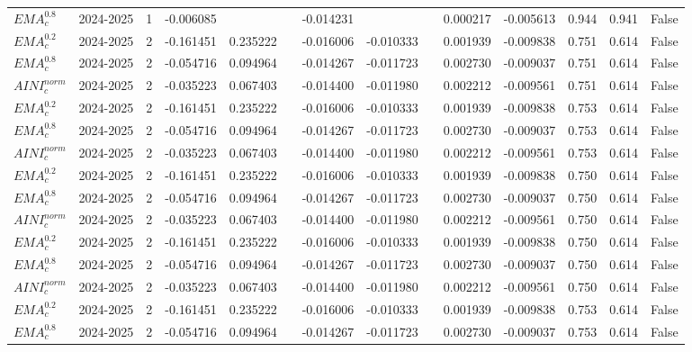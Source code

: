 \begin{tabular}{@{}llrrrrrrrrrlll@{}}
$EMA^{0.8}_{c}$ & 2024-2025 & 1 & -0.006085 &  &  & -0.014231 &  &  & 0.000217 & -0.005613 & 0.944 & 0.941 & False \\
$EMA^{0.2}_{c}$ & 2024-2025 & 2 & -0.161451 & 0.235222 &  & -0.016006 & -0.010333 &  & 0.001939 & -0.009838 & 0.751 & 0.614 & False \\
$EMA^{0.8}_{c}$ & 2024-2025 & 2 & -0.054716 & 0.094964 &  & -0.014267 & -0.011723 &  & 0.002730 & -0.009037 & 0.751 & 0.614 & False \\
$AINI^{norm}_{c}$ & 2024-2025 & 2 & -0.035223 & 0.067403 &  & -0.014400 & -0.011980 &  & 0.002212 & -0.009561 & 0.751 & 0.614 & False \\
$EMA^{0.2}_{c}$ & 2024-2025 & 2 & -0.161451 & 0.235222 &  & -0.016006 & -0.010333 &  & 0.001939 & -0.009838 & 0.753 & 0.614 & False \\
$EMA^{0.8}_{c}$ & 2024-2025 & 2 & -0.054716 & 0.094964 &  & -0.014267 & -0.011723 &  & 0.002730 & -0.009037 & 0.753 & 0.614 & False \\
$AINI^{norm}_{c}$ & 2024-2025 & 2 & -0.035223 & 0.067403 &  & -0.014400 & -0.011980 &  & 0.002212 & -0.009561 & 0.753 & 0.614 & False \\
$EMA^{0.2}_{c}$ & 2024-2025 & 2 & -0.161451 & 0.235222 &  & -0.016006 & -0.010333 &  & 0.001939 & -0.009838 & 0.750 & 0.614 & False \\
$EMA^{0.8}_{c}$ & 2024-2025 & 2 & -0.054716 & 0.094964 &  & -0.014267 & -0.011723 &  & 0.002730 & -0.009037 & 0.750 & 0.614 & False \\
$AINI^{norm}_{c}$ & 2024-2025 & 2 & -0.035223 & 0.067403 &  & -0.014400 & -0.011980 &  & 0.002212 & -0.009561 & 0.750 & 0.614 & False \\
$EMA^{0.2}_{c}$ & 2024-2025 & 2 & -0.161451 & 0.235222 &  & -0.016006 & -0.010333 &  & 0.001939 & -0.009838 & 0.750 & 0.614 & False \\
$EMA^{0.8}_{c}$ & 2024-2025 & 2 & -0.054716 & 0.094964 &  & -0.014267 & -0.011723 &  & 0.002730 & -0.009037 & 0.750 & 0.614 & False \\
$AINI^{norm}_{c}$ & 2024-2025 & 2 & -0.035223 & 0.067403 &  & -0.014400 & -0.011980 &  & 0.002212 & -0.009561 & 0.750 & 0.614 & False \\
$EMA^{0.2}_{c}$ & 2024-2025 & 2 & -0.161451 & 0.235222 &  & -0.016006 & -0.010333 &  & 0.001939 & -0.009838 & 0.753 & 0.614 & False \\
$EMA^{0.8}_{c}$ & 2024-2025 & 2 & -0.054716 & 0.094964 &  & -0.014267 & -0.011723 &  & 0.002730 & -0.009037 & 0.753 & 0.614 & False \\

\end{tabular}
